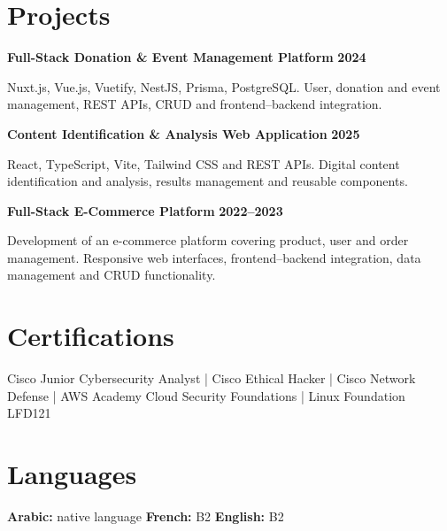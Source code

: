 \documentclass[10pt,a4paper]{article}
\begin{document}

\section*{Projects}

\textbf{Full-Stack Donation \& Event Management Platform}
\hfill \textbf{2024}

Nuxt.js, Vue.js, Vuetify, NestJS, Prisma, PostgreSQL. User, donation and event
management, REST APIs, CRUD and frontend--backend integration.

\textbf{Content Identification \& Analysis Web Application}
\hfill \textbf{2025}

React, TypeScript, Vite, Tailwind CSS and REST APIs. Digital content
identification and analysis, results management and reusable components.

\textbf{Full-Stack E-Commerce Platform}
\hfill \textbf{2022--2023}

Development of an e-commerce platform covering product, user and order
management. Responsive web interfaces, frontend--backend integration, data
management and CRUD functionality.


\section*{Certifications}

Cisco Junior Cybersecurity Analyst \;|\;
Cisco Ethical Hacker \;|\;
Cisco Network Defense \;|\;
AWS Academy Cloud Security Foundations \;|\;
Linux Foundation LFD121


\section*{Languages}

\textbf{Arabic:} native language \quad
\textbf{French:} B2 \quad
\textbf{English:} B2
\end{document}
